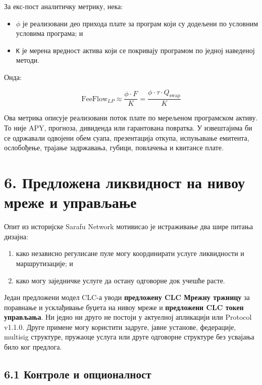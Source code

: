 \documentclass[11pt]{article}
\begin{document}
За екс-пост аналитичку метрику, нека:

\begin{itemize}[leftmargin=*]
\item \texttt{$\phi$} је реализовани део прихода плате за програм који су додељени по условним условима програма; и
\item \texttt{K} је мерена вредност актива који се покривају програмом по једној наведеној методи.
\end{itemize}
Онда:

\[
\mathrm{FeeFlow}_{LP} \approx \frac{\phi \cdot F}{K} = \frac{\phi \cdot \tau \cdot Q_{\mathrm{swap}}}{K}
\]

Ова метрика описује реализовани поток плате по мерељеном програмском активу. То није APY, прогноза, дивиденда или гарантована повратка. У извештајима би се одржавали одвојени обем суапа, презентација откупа, испуњавање емитента, ослобођење, трајање задржавања, губици, повлачења и квитансе плате.


\section*{6. Предложена ликвидност на нивоу мреже и управљање}

Опит из историјске Sarafu Network мотивисао је истраживање два шире питања дизајна:

\begin{enumerate}[leftmargin=*]
\item како независно регулисане пуле могу координирати услуге ликвидности и маршрутизације; и
\item како могу заједничке услуге да остану одговорне док учешће расте.
\end{enumerate}
Један предложени модел CLC-а уводи \textbf{предложену CLC Мрежну тржницу} за поравнање и усклађивање буџета на нивоу мреже и \textbf{предложени CLC токен управљања}. Ни једно ни друго не постоји у актуелној апликацији или Protocol v1.1.0. Друге примене могу користити задруге, јавне установе, федерације, multisig структуре, пружаоце услуга или друге одговорне структуре без усвајања било ког предлога.

\subsection*{6.1 Контроле и опционалност}
\end{document}
